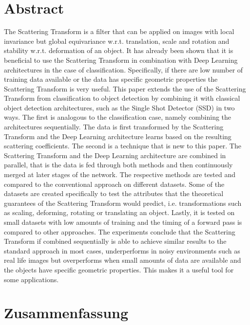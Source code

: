 \chapter*{Abstract}
\label{chap:abstract}

The Scattering Transform is a filter that can be applied on images with local invariance but global equivariance w.r.t. translation, scale and rotation and stability w.r.t. deformation of an object. It has already been shown that it is beneficial to use the Scattering Transform in combination with Deep Learning architectures in the case of classification. Specifically, if there are low number of training data available or the data has specific geometric properties the Scattering Transform is very useful. This paper extends the use of the Scattering Transform from classification to object detection by combining it with classical object detection architectures, such as the Single Shot Detector (SSD) in two ways. The first is analogous to the classification case, namely combining the architectures sequentially. The data is first transformed by the Scattering Transform and the Deep Learning architecture learns based on the resulting scattering coefficients. The second is a technique that is new to this paper. The Scattering Transform and the Deep Learning architecture are combined in parallel, that is the data is fed through both methods and then continuously merged at later stages of the network. The respective methods are tested and compared to the conventional approach on different datasets. Some of the datasets are created specifically to test the attributes that the theoretical guarantees of the Scattering Transform would predict, i.e. transformations such as scaling, deforming, rotating or translating an object. Lastly, it is tested on small datasets with low amounts of training and the timing of a forward pass is compared to other approaches. The experiments conclude that the Scattering Transform if combined sequentially is able to achieve similar results to the standard approach in most cases, underperforms in noisy environments such as real life images but overperforms when small amounts of data are available and the objects have specific geometric properties. This makes it a useful tool for some applications.

\chapter*{Zusammenfassung}
\label{chap:zusammenfassung}

